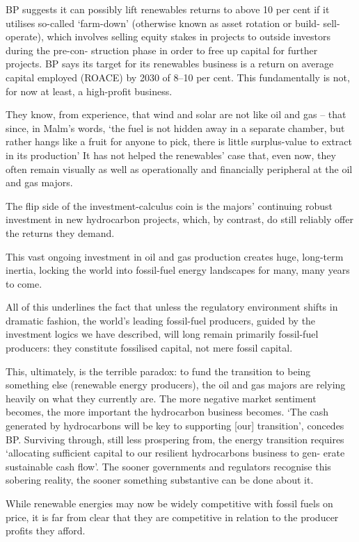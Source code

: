 \documentclass[
]{book}
\begin{document}
BP suggests it can possibly lift renewables returns to
above 10 per cent if it utilises so-called `farm-down' (otherwise known as asset rotation or build-
sell-operate), which involves selling equity stakes in projects to outside investors during the pre-con-
struction phase in order to free up capital for further projects.
BP says its target for its renewables business is a return on average capital
employed (ROACE) by 2030 of 8--10 per cent.
This fundamentally is not, for
now at least, a high-proﬁt business.

They know, from experience, that wind and solar are not like oil and gas -- that since, in Malm's
words, `the fuel is not hidden away in a separate chamber, but rather hangs like a fruit for anyone to
pick, there is little surplus-value to extract in its production'
It has not helped the renewables' case that, even now, they often
remain visually as well as operationally and ﬁnancially peripheral at the oil and gas majors.

The ﬂip side of the investment-calculus coin is the majors' continuing robust investment in new
hydrocarbon projects, which, by contrast, do still reliably oﬀer the returns they demand.

This vast ongoing investment in oil and gas production
creates huge, long-term inertia, locking the world into fossil-fuel energy landscapes for many,
many years to come.

All of this underlines the fact that unless the regulatory environment shifts in dramatic fashion,
the world's leading fossil-fuel producers, guided by the investment logics we have described, will
long remain primarily fossil-fuel producers: they constitute fossilised capital, not mere fossil
capital.

This, ultimately, is the terrible paradox: to fund the transition
to being something else (renewable energy producers), the oil and gas majors are relying heavily on
what they currently are. The more negative market sentiment becomes, the more important the
hydrocarbon business becomes. `The cash generated by hydrocarbons will be key to supporting
{[}our{]} transition', concedes BP. Surviving through, still less prospering from, the
energy transition requires `allocating suﬃcient capital to our resilient hydrocarbons business to gen-
erate sustainable cash ﬂow'. The sooner governments and regulators recognise this sobering
reality, the sooner something substantive can be done about it.

While renewable energies may now be widely competitive with fossil
fuels on price, it is far from clear that they are competitive in relation to the producer proﬁts they
aﬀord.
\end{document}
